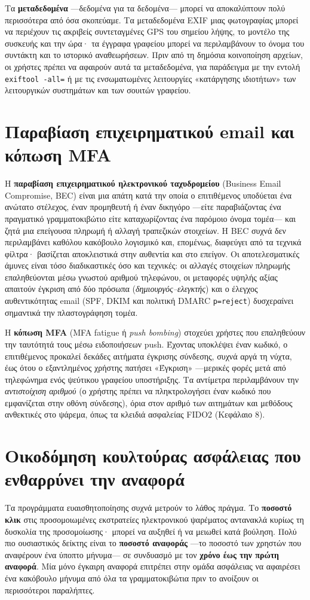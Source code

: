 Τα \textbf{μεταδεδομένα} —δεδομένα για τα δεδομένα— μπορεί να αποκαλύπτουν πολύ περισσότερα από όσα σκοπεύαμε. Τα μεταδεδομένα EXIF μιας φωτογραφίας μπορεί να περιέχουν τις ακριβείς συντεταγμένες GPS του σημείου λήψης, το μοντέλο της συσκευής και την ώρα· τα έγγραφα γραφείου μπορεί να περιλαμβάνουν το όνομα του συντάκτη και το ιστορικό αναθεωρήσεων. Πριν από τη δημόσια κοινοποίηση αρχείων, οι χρήστες πρέπει να αφαιρούν αυτά τα μεταδεδομένα, για παράδειγμα με την εντολή \texttt{exiftool -all=} ή με τις ενσωματωμένες λειτουργίες «κατάργησης ιδιοτήτων» των λειτουργικών συστημάτων και των σουιτών γραφείου.

\section{Παραβίαση επιχειρηματικού email και κόπωση MFA}\label{sec:5.5}
Η \textbf{παραβίαση επιχειρηματικού ηλεκτρονικού ταχυδρομείου} (Business Email Compromise, BEC) είναι μια απάτη κατά την οποία ο επιτιθέμενος υποδύεται ένα ανώτατο στέλεχος, έναν προμηθευτή ή έναν δικηγόρο —είτε παραβιάζοντας ένα πραγματικό γραμματοκιβώτιο είτε καταχωρίζοντας ένα παρόμοιο όνομα τομέα— και ζητά μια επείγουσα πληρωμή ή αλλαγή τραπεζικών στοιχείων. Η BEC συχνά δεν περιλαμβάνει καθόλου κακόβουλο λογισμικό και, επομένως, διαφεύγει από τα τεχνικά φίλτρα· βασίζεται αποκλειστικά στην αυθεντία και στο επείγον. Οι αποτελεσματικές άμυνες είναι τόσο διαδικαστικές όσο και τεχνικές: οι αλλαγές στοιχείων πληρωμής επαληθεύονται μέσω γνωστού αριθμού τηλεφώνου, οι μεταφορές υψηλής αξίας απαιτούν έγκριση από δύο πρόσωπα (\emph{δημιουργός–ελεγκτής}) και ο έλεγχος αυθεντικότητας email (SPF, DKIM και πολιτική DMARC \texttt{p=reject}) δυσχεραίνει σημαντικά την πλαστογράφηση τομέα.

Η \textbf{κόπωση MFA} (MFA fatigue ή \emph{push bombing}) στοχεύει χρήστες που επαληθεύουν την ταυτότητά τους μέσω ειδοποιήσεων push. Έχοντας υποκλέψει έναν κωδικό, ο επιτιθέμενος προκαλεί δεκάδες αιτήματα έγκρισης σύνδεσης, συχνά αργά τη νύχτα, έως ότου ο εξαντλημένος χρήστης πατήσει «Έγκριση» —μερικές φορές μετά από τηλεφώνημα ενός ψεύτικου γραφείου υποστήριξης. Τα αντίμετρα περιλαμβάνουν την \emph{αντιστοίχιση αριθμού} (ο χρήστης πρέπει να πληκτρολογήσει έναν κωδικό που εμφανίζεται στην οθόνη σύνδεσης), όρια στον αριθμό των αιτημάτων και μεθόδους ανθεκτικές στο ψάρεμα, όπως τα κλειδιά ασφαλείας FIDO2 (Κεφάλαιο 8).

\section{Οικοδόμηση κουλτούρας ασφάλειας που ενθαρρύνει την αναφορά}\label{sec:5.6}
Τα προγράμματα ευαισθητοποίησης συχνά μετρούν το λάθος πράγμα. Το \textbf{ποσοστό κλικ} στις προσομοιωμένες εκστρατείες ηλεκτρονικού ψαρέματος αντανακλά κυρίως τη δυσκολία της προσομοίωσης· μπορεί να αυξηθεί ή να μειωθεί κατά βούληση. Πολύ πιο ουσιαστικός δείκτης είναι το \textbf{ποσοστό αναφοράς} —το ποσοστό των χρηστών που αναφέρουν ένα ύποπτο μήνυμα— σε συνδυασμό με τον \textbf{χρόνο έως την πρώτη αναφορά}. Μία μόνο έγκαιρη αναφορά επιτρέπει στην ομάδα ασφάλειας να αφαιρέσει ένα κακόβουλο μήνυμα από όλα τα γραμματοκιβώτια πριν το ανοίξουν οι περισσότεροι παραλήπτες.

